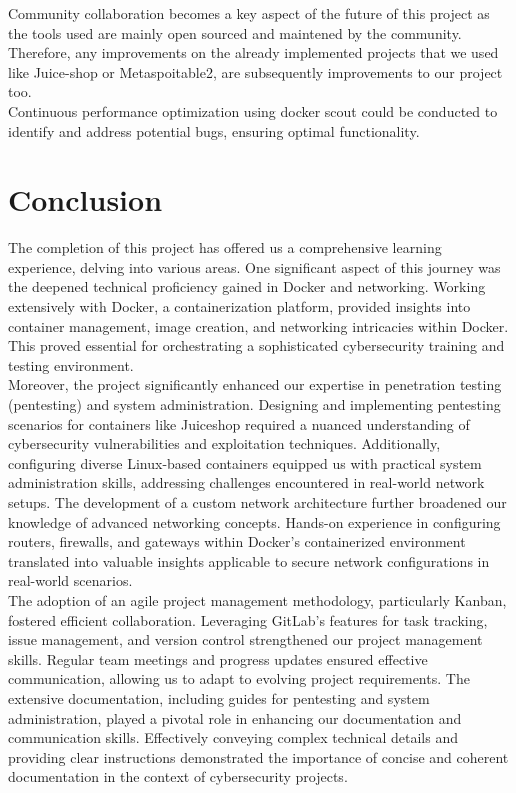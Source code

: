 \documentclass[a4paper,11pt,singlespacing]{article}
\begin{document}
Community collaboration becomes a key aspect of the future of this project as the tools used are mainly open sourced and maintened by the community. Therefore, any improvements on the already implemented projects that we used like Juice-shop or Metaspoitable2, are subsequently improvements to our project too.\\

Continuous performance optimization using docker scout could be conducted to identify and address potential bugs, ensuring optimal functionality.
\newpage

\section{Conclusion}

The completion of this project has offered us a comprehensive learning experience, delving into various areas. One significant aspect of this journey was the deepened technical proficiency gained in Docker and networking. Working extensively with Docker, a containerization platform, provided insights into container management, image creation, and networking intricacies within Docker. This proved essential for orchestrating a sophisticated cybersecurity training and testing environment.\\

Moreover, the project significantly enhanced our expertise in penetration testing (pentesting) and system administration. Designing and implementing pentesting scenarios for containers like Juiceshop required a nuanced understanding of cybersecurity vulnerabilities and exploitation techniques. Additionally, configuring diverse Linux-based containers equipped us with practical system administration skills, addressing challenges encountered in real-world network setups. The development of a custom network architecture further broadened our knowledge of advanced networking concepts. Hands-on experience in configuring routers, firewalls, and gateways within Docker’s containerized environment translated into valuable insights applicable to secure network configurations in real-world scenarios.\\

The adoption of an agile project management methodology, particularly Kanban, fostered efficient collaboration. Leveraging GitLab’s features for task tracking, issue management, and version control strengthened our project management skills. Regular team meetings and progress updates ensured effective communication, allowing us to adapt to evolving project requirements. The extensive documentation, including guides for pentesting and system administration, played a pivotal role in enhancing our documentation and communication skills. Effectively conveying complex technical details and providing clear instructions demonstrated the importance of concise and coherent documentation in the context of cybersecurity projects.\\
\end{document}

